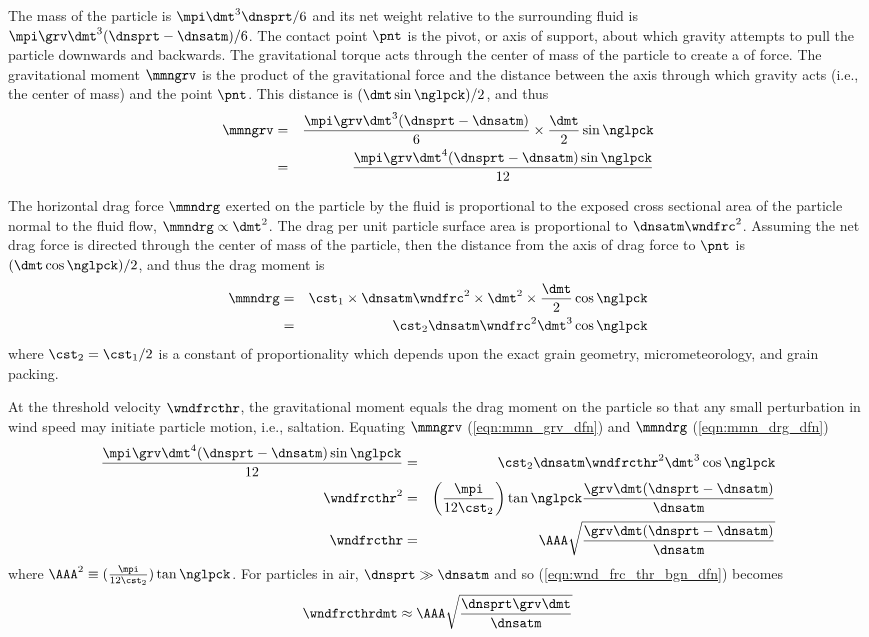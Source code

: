 \documentclass[12pt,twoside]{book}
\begin{document}
The mass of the particle is $\mpi \dmt^{3} \dnsprt / 6$ and its
net weight relative to the surrounding fluid is $\mpi \grv \dmt^{3}
(\dnsprt - \dnsatm) / 6$. 
The contact point $\pnt$ is the pivot, or axis of support, about which
gravity attempts to pull the particle downwards and backwards.
The gravitational torque acts through the center of mass of the
particle to create a  of force. 
The gravitational moment $\mmngrv$ is the product of the gravitational
force and the distance between the axis through which gravity acts
(i.e., the center of mass) and the point $\pnt$.
This distance is $(\dmt \sin \nglpck)/2$, and thus 
\begin{eqnarray}
\mmngrv & = & \frac{\mpi \grv \dmt^{3} (\dnsprt - \dnsatm)}{6} \times 
\frac{\dmt}{2} \sin \nglpck \nonumber \\
& = & \frac{\mpi \grv \dmt^{4} (\dnsprt - \dnsatm) \sin \nglpck}{12}
\label{eqn:mmn_grv_dfn}
\end{eqnarray}

The horizontal drag force $\mmndrg$ exerted on the particle by the
fluid is proportional to the exposed cross sectional area of the
particle normal to the fluid flow, $\mmndrg \propto \dmt^{2}$. 
The drag per unit particle surface area is proportional to $\dnsatm  
\wndfrc^{2}$. 
Assuming the net drag force is directed through the center of mass of
the particle, then the distance from the axis of drag force to $\pnt$ 
is $(\dmt \cos \nglpck)/2$, and thus the drag moment is
\begin{eqnarray}
\mmndrg & = & \cst_{1} \times \dnsatm \wndfrc^{2} \times \dmt^{2}  \times
\frac{\dmt}{2} \cos \nglpck \nonumber \\
& = & \cst_{2} \dnsatm \wndfrc^{2} \dmt^{3} \cos \nglpck
\label{eqn:mmn_drg_dfn}
\end{eqnarray}
where $\cst_{2} = \cst_{1} / 2$ is a constant of proportionality which
depends upon the exact grain geometry, micrometeorology, and grain
packing. 

At the threshold velocity $\wndfrcthr$, the gravitational moment
equals the drag moment on the particle so that any small perturbation
in wind speed may initiate particle motion, i.e., saltation.  
Equating $\mmngrv$ (\ref{eqn:mmn_grv_dfn}) and $\mmndrg$
(\ref{eqn:mmn_drg_dfn}) 
\begin{eqnarray}
\frac{\mpi \grv \dmt^{4} (\dnsprt - \dnsatm) \sin \nglpck}{12} 
& = & \cst_{2} \dnsatm \wndfrcthr^{2} \dmt^{3} \cos \nglpck
\nonumber \\
\wndfrcthr^{2} & = & \left( \frac{\mpi}{12 \cst_{2}} \right) \tan \nglpck
\frac{\grv \dmt (\dnsprt - \dnsatm)}{\dnsatm} 
\nonumber \\
\wndfrcthr & = & \AAA
\sqrt{ \frac{\grv \dmt (\dnsprt - \dnsatm)}{\dnsatm}}
\label{eqn:wnd_frc_thr_bgn_dfn}
\end{eqnarray}
where $\AAA^{2} \equiv ( \frac{\mpi}{12 \cst_{2}} ) \tan \nglpck$.
For particles in air, $\dnsprt \gg \dnsatm$ and so
(\ref{eqn:wnd_frc_thr_bgn_dfn}) becomes
\begin{equation}
\wndfrcthrdmt \approx \AAA \sqrt{ \frac{\dnsprt \grv \dmt}{\dnsatm}}
\label{eqn:wnd_frc_thr_bgn_prx}
\end{equation}
\end{document}
